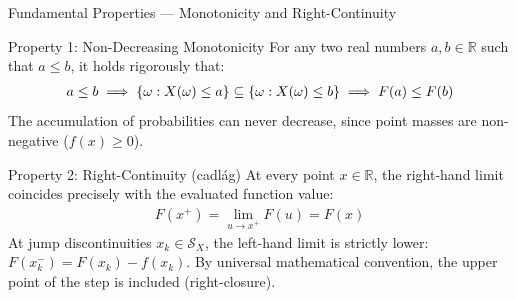 \documentclass[aspectratio=169,xcolor={dvipsnames,table}]{beamer}
\begin{document}
\begin{frame}{Fundamental Properties --- Monotonicity and Right-Continuity}
	\begin{block}{Property 1: Non-Decreasing Monotonicity}
		\footnotesize
		For any two real numbers $a, b \in \mathbb{R}$ such that $a \le b$, it holds rigorously that:
		\begin{align*}
			a \le b \implies \left\{ \omega : X(\omega) \le a \right\} \subseteq \left\{ \omega : X(\omega) \le b \right\} \implies F(a) \le F(b)
		\end{align*}
		The accumulation of probabilities can never decrease, since point masses are non-negative ($f(x) \ge 0$).
	\end{block}
	\vspace{-0.15cm}
	\begin{block}{Property 2: Right-Continuity (cadlág)}
		\footnotesize
		At every point $x \in \mathbb{R}$, the right-hand limit coincides precisely with the evaluated function value:
		\begin{align*}
			F(x^+) = \lim_{u \to x^+} F(u) = F(x)
		\end{align*}
		At jump discontinuities $x_k \in \mathcal{S}_X$, the left-hand limit is strictly lower: $F(x_k^-) = F(x_k) - f(x_k)$. By universal mathematical convention, the upper point of the step is included (right-closure).
	\end{block}
\end{frame}
\end{document}
